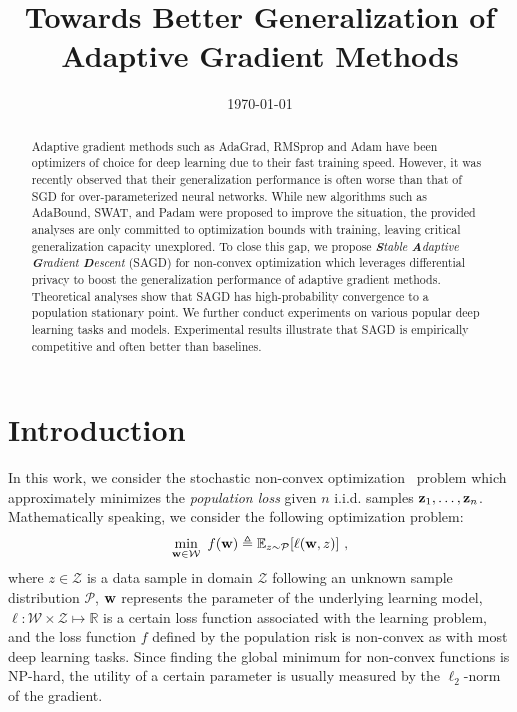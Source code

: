 \documentclass[11pt]{article}
\begin{document}
\title{Towards Better Generalization of Adaptive Gradient Methods}
\date{\today}

\maketitle


\begin{abstract}
Adaptive gradient methods such as AdaGrad, RMSprop and Adam have been optimizers of choice for deep learning due to their fast training speed. However, it was recently observed that their generalization performance is often worse than that of SGD for over-parameterized neural networks. While new algorithms such as AdaBound, SWAT, and Padam were proposed to improve the situation, the provided analyses are only committed to optimization bounds with training, leaving critical generalization capacity unexplored. To close this gap, we propose \textit{\textbf{S}table \textbf{A}daptive \textbf{G}radient \textbf{D}escent} (SAGD) for non-convex optimization which leverages differential privacy to boost the generalization performance of adaptive gradient methods. Theoretical analyses show that SAGD has high-probability convergence to a population stationary point. We further conduct experiments on various popular deep learning tasks and models. Experimental results illustrate that SAGD is empirically competitive and often better than baselines. 
\end{abstract}

\section{Introduction}


In this work, we consider the stochastic non-convex optimization~\cite{zare18} problem which approximately minimizes the \emph{population loss} given $n $ i.i.d. samples $\mathbf{z}_{1}, \dots, \mathbf{z}_{n}$. Mathematically speaking, we consider the following optimization problem:
\begin{equation} \label{eq: problem}
 \min_{\w \in \cW}~ f({\w})
 \triangleq {\mathbb{E}_{z \sim \mathcal{P}}}[\ell(\w,z)]~,
\end{equation}
where $z\in \mathcal{Z}$ is a data sample in domain $\mathcal{Z}$ following an unknown sample distribution $\mathcal{P}$, ${\mathbf{w}}$ represents the parameter of the underlying learning model, $\ell:\mathcal{W}\times \mathcal{Z}\mapsto \mathbb{R} $ is a certain loss function associated with the learning problem, and the loss function $f$ defined by the population risk is non-convex as with most deep learning tasks. Since  finding the global minimum for non-convex functions
is NP-hard, the utility of a certain parameter is usually measured by the $\ell_2$-norm of the gradient. 
\end{document}
